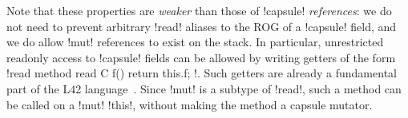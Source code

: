 Note that these properties are \emph{weaker} than those of \Q!capsule! \emph{references}: we do not need to prevent arbitrary \Q!read! aliases to the ROG of a \Q!capsule! field, and we do allow \Q!mut! references to exist on the stack. In particular, unrestricted readonly access to \Q!capsule! fields can be allowed by writing getters of the form \Q!read method read C f() { return this.f; }!. Such getters are already a fundamental part of the L42 language~\cite{?}. Since \Q!mut! is a subtype of \Q!read!, such a method can be called on a \Q!mut! \Q!this!, without making the method a capsule mutator.






